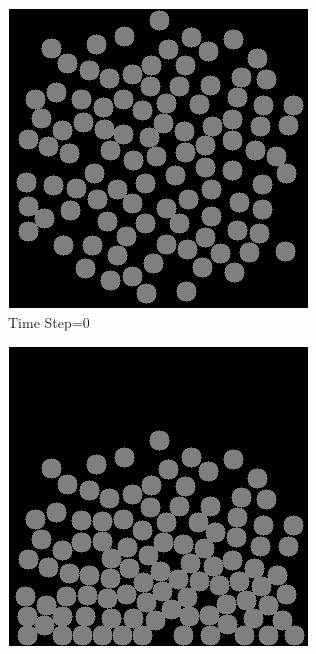     \begin{figure}[!h]
        \centering
        \begin{subfigure}[b]{0.3\textwidth}
            \includegraphics[width=\textwidth]{Figures/sim0.png}
            \caption{Time Step=$0$}
        \end{subfigure}
        \begin{subfigure}[b]{0.3\textwidth}
            \includegraphics[width=\textwidth]{Figures/sim2.png}

\end{subfigure}
\end{figure}
